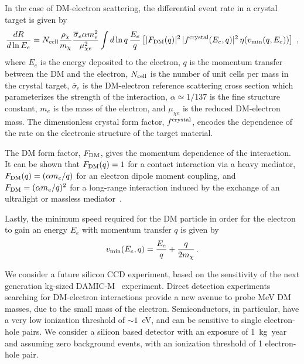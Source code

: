 In the case of DM-electron scattering, the differential event rate in a crystal target is given by~\cite{Essig:2015cda}
\begin{equation}
    \label{eq:diff_rate}
  \frac{dR}{ d\ln E_{e}  }  =  N_{\rm cell}\frac{\rho_\chi}{m_\chi}\frac{\overline\sigma_e \alpha m_e^2}{\mu_{\chi e}^2} \int d\ln q\, \frac{E_e}{q}\left[ |F_{\rm DM}(q)|^2 \,
              |f^{\rm crystal}(E_e, q)|^2 \,
                   \eta(v_{\rm min}(q, E_e)) \right]\; ,
\end{equation}
where $E_e$ is the energy deposited to the electron, $q$ is the  momentum transfer between the DM and the electron, $N_{\rm cell}$ is the number of unit cells per mass in the crystal target, $\overline\sigma_e$ is the DM-electron reference scattering cross section which parameterizes the strength of the interaction, $\alpha \simeq 1/137$ is the fine structure constant, $m_e$ is the mass of the electron, and $\mu_{\chi e}$ is the reduced DM-electron mass. The dimensionless crystal form factor, $f^{\rm crystal}$, encodes the dependence of the rate on the electronic structure of the target material. 

The DM form factor, $F_{\rm DM}$, gives the momentum dependence of the interaction. It can be shown that $F_{\rm DM}(q)=1$ for a contact interaction via a heavy mediator, $F_{\rm DM}(q)=(\alpha m_e/q)$ for an electron dipole moment coupling, and $F_{\rm DM}=(\alpha m_e/q)^2$ for a long-range interaction induced by the exchange of an ultralight or massless mediator~\cite{Essig:2015cda}.

Lastly, the minimum speed required for the DM particle in order for the electron to gain an energy $E_e$ with momentum transfer $q$ is given by
\begin{equation}
v_{\rm min}(E_e,q)=\frac{E_e}{q}+\frac{q}{2m_\chi}\, .
\label{eq: vmin-e}
\end{equation}



We consider a future silicon CCD experiment, based on the sensitivity of the next generation kg-sized DAMIC-M~\cite{Lee:2020abc, Castello-Mor:2020jhd, DAMIC-M:2023gxo} experiment. Direct detection experiments searching for DM-electron interactions provide a new avenue to probe MeV DM masses, due to the small mass of the electron. Semiconductors, in particular, have a very low ionization threshold of $\sim 1$~eV, and can be sensitive to single electron-hole pairs. We consider a silicon based detector with  an exposure of 1~kg~year and assuming zero background events, with an ionization threshold of 1 electron-hole pair. 

